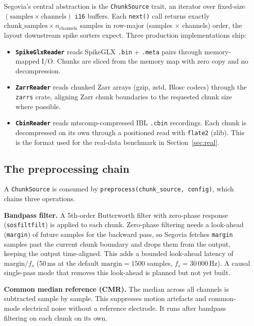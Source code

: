 \documentclass[11pt]{article}
\begin{document}
Segovia's central abstraction is the \texttt{ChunkSource} trait, an iterator over fixed-size
$(\text{samples} \times \text{channels})$ \texttt{i16} buffers. Each \texttt{next()} call returns
exactly $\text{chunk\_samples} \times n_{\text{channels}}$ samples in row-major (samples $\times$
channels) order, the layout downstream spike sorters expect. Three production implementations ship:

\begin{itemize}
  \item \textbf{\texttt{SpikeGlxReader}} reads SpikeGLX \texttt{.bin} + \texttt{.meta} pairs through
  memory-mapped I/O. Chunks are sliced from the memory map with zero copy and no decompression.
  \item \textbf{\texttt{ZarrReader}} reads chunked Zarr arrays (gzip, zstd, Blosc codecs) through the
  \texttt{zarrs} crate, aligning Zarr chunk boundaries to the requested chunk size where possible.
  \item \textbf{\texttt{CbinReader}} reads mtscomp-compressed IBL \texttt{.cbin} recordings. Each chunk
  is decompressed on its own through a positioned read with \texttt{flate2} (zlib). This is the format
  used for the real-data benchmark in Section~\ref{sec:real}.
\end{itemize}

\subsection{The preprocessing chain}

A \texttt{ChunkSource} is consumed by \texttt{preprocess(chunk\_source, config)}, which chains three
operations.

\textbf{Bandpass filter.} A 5th-order Butterworth filter with zero-phase response
(\texttt{sosfiltfilt}) is applied to each chunk. Zero-phase filtering needs a look-ahead
(\texttt{margin}) of future samples for the backward pass, so Segovia fetches \texttt{margin} samples
past the current chunk boundary and drops them from the output, keeping the output time-aligned. This
adds a bounded look-ahead latency of $\text{margin} / f_s$ (50\,ms at the default
$\text{margin} = 1500$ samples, $f_s = 30\,000$\,Hz). A causal single-pass mode that removes this
look-ahead is planned but not yet built.

\textbf{Common median reference (CMR).} The median across all channels is subtracted sample by sample.
This suppresses motion artefacts and common-mode electrical noise without a reference electrode. It
runs after bandpass filtering on each chunk on its own.
\end{document}
